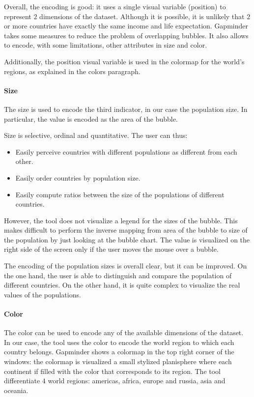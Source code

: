 Overall, the encoding is good:
it uses a single visual variable (position) to represent $2$ dimensions of the dataset.
Although it is possible, it is unlikely that $2$ or more countries have exactly the same income and life expectation.
Gapminder takes some measures to reduce the problem of overlapping bubbles.
It also allows to encode, with some limitations, other attributes in size and color.

Additionally, the position visual variable is used in the colormap for the world's regions, as explained in the colors paragraph.


\paragraph{Size}
The size is used to encode the third indicator, in our case the population size.
In particular, the value is encoded as the area of the bubble.

Size is selective, ordinal and quantitative.
The user can thus:
\begin{itemize}
    \item Easily perceive countries with different populations as different from each other.
    \item Easily order countries by population size.
    \item Easily compute ratios between the size of the populations of different countries.
\end{itemize}

However, the tool does not visualize a legend for the sizes of the bubble.
This makes difficult to perform the inverse mapping from area of the bubble to size of the population by just looking at the bubble chart.
The value is visualized on the right side of the screen only if the user moves the mouse over a bubble.

The encoding of the population sizes is overall clear, but it can be improved.
On the one hand, the user is able to distinguish and compare the population of different countries.
On the other hand, it is quite complex to visualize the real values of the populations.

\paragraph{Color}
\label{paragraph:bubbles-color}
The color can be used to encode any of the available dimensions of the dataset.
In our case, the tool uses the color to encode the world region to which each country belongs.
Gapminder shows a colormap in the top right corner of the windows:
the colormap is visualized a small stylized planisphere where each continent if filled with the color that corresponds to its region.
The tool differentiate $4$ world regions: americas, africa, europe and russia, asia and oceania.

